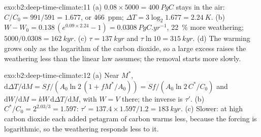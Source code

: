 \begin{solution}{exo:b2:deep-time-climate:11}
(a) $0.08\times5000 = \qty{400}{PgC}$ stays in the air: $C/C_0 = 991/591 = 1.677$, or
\qty{466}{ppm}; $\Delta T = 3\log_2 1.677 = \qty{2.24}{K}$. (b) $W - W_0 = 0.138\,(e^{0.09\times2.24}
- 1) = \qty{0.0308}{PgC.yr^{-1}}$, \qty{22}{\percent} more weathering; $5000/0.0308 =
\qty{162}{kyr}$. (c) $\tau = \qty{137}{kyr}$ and $\tau\ln10 = \qty{315}{kyr}$. (d) The warming grows
only as the logarithm of the carbon dioxide, so a large excess raises the weathering less than the
linear law assumes; the removal starts more slowly.
\end{solution}

\begin{solution}{exo:b2:deep-time-climate:12}
(a) Near $M^*$, $\mathrm d\Delta T/\mathrm dM = Sf/(A_0\ln 2\,(1 + fM^*/A_0)) = Sf/(A_0\ln 2\,
C^*/C_0)$ and $\mathrm dW/\mathrm dM = kW\,\mathrm d\Delta T/\mathrm dM$, with $W = V$ there; the
inverse is $\tau'$. (b) $C^*/C_0 = 2^{2.03/3} = 1.597$: $\tau' = 137.4\times1.597/1.2 =
\qty{183}{kyr}$. (c) Slower: at high carbon dioxide each added petagram of carbon warms less,
because the forcing is logarithmic, so the weathering responds less to it.
\end{solution}

